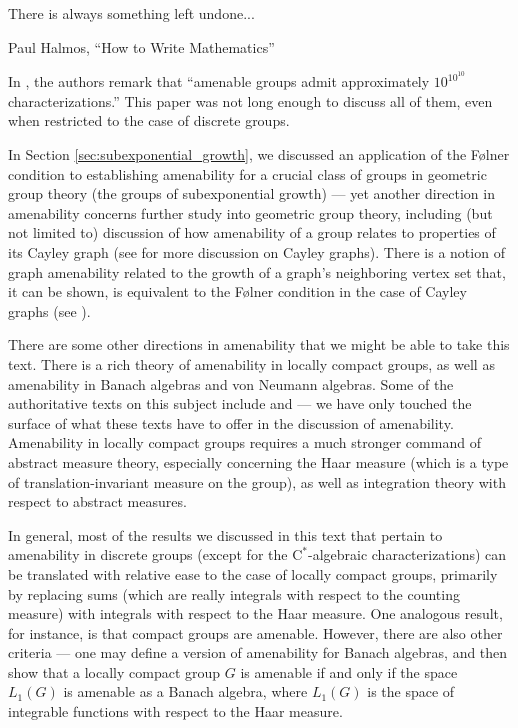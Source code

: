 \epigraph{There is always something left undone...}{Paul Halmos, ``How to Write Mathematics''}
In \cite[48]{brown_and_ozawa}, the authors remark that ``amenable groups admit approximately $10^{10^{10}}$ characterizations.'' This paper was not long enough to discuss all of them, even when restricted to the case of discrete groups.\newline

In Section \ref{sec:subexponential_growth}, we discussed an application of the Følner condition to establishing amenability for a crucial class of groups in geometric group theory (the groups of subexponential growth) --- yet another direction in amenability concerns further study into geometric group theory, including (but not limited to) discussion of how amenability of a group relates to properties of its Cayley graph (see \cite[Section 3.2]{loh_geometric_group_theory} for more discussion on Cayley graphs). There is a notion of graph amenability related to the growth of a graph's neighboring vertex set that, it can be shown, is equivalent to the Følner condition in the case of Cayley graphs (see \cite{monfared_cayley_graphs}).\newline

There are some other directions in amenability that we might be able to take this text. There is a rich theory of amenability in locally compact groups, as well as amenability in Banach algebras and von Neumann algebras. Some of the authoritative texts on this subject include \cite{kazhdan_property_t} and \cite{amenable_banach_algebras} --- we have only touched the surface of what these texts have to offer in the discussion of amenability. Amenability in locally compact groups requires a much stronger command of abstract measure theory, especially concerning the Haar measure (which is a type of translation-invariant measure on the group), as well as integration theory with respect to abstract measures.\newline

In general, most of the results we discussed in this text that pertain to amenability in discrete groups (except for the $\mathrm{C}^{\ast}$-algebraic characterizations) can be translated with relative ease to the case of locally compact groups, primarily by replacing sums (which are really integrals with respect to the counting measure) with integrals with respect to the Haar measure. One analogous result, for instance, is that compact groups are amenable. However, there are also other criteria --- one may define a version of amenability for Banach algebras, and then show that a locally compact group $G$ is amenable if and only if the space $L_1\left( G \right)$ is amenable as a Banach algebra, where $L_1\left( G \right)$ is the space of integrable functions with respect to the Haar measure.\newline

